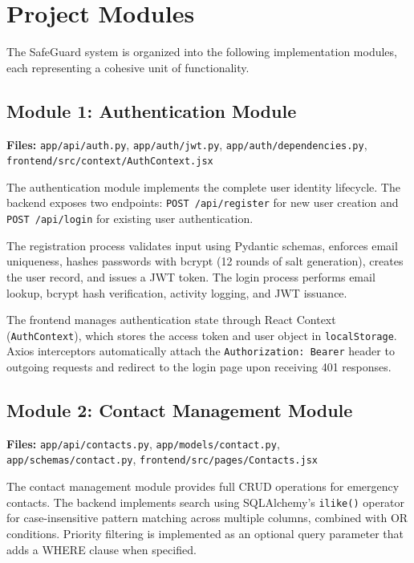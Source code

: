 \section{Project Modules}

The SafeGuard system is organized into the following implementation modules, each representing a cohesive unit of functionality.

\subsection{Module 1: Authentication Module}

\textbf{Files:} \texttt{app/api/auth.py}, \texttt{app/auth/jwt.py}, \texttt{app/auth/dependencies.py}, \texttt{frontend/src/context/AuthContext.jsx}

The authentication module implements the complete user identity lifecycle. The backend exposes two endpoints: \texttt{POST /api/register} for new user creation and \texttt{POST /api/login} for existing user authentication.

The registration process validates input using Pydantic schemas, enforces email uniqueness, hashes passwords with bcrypt (12 rounds of salt generation), creates the user record, and issues a JWT token. The login process performs email lookup, bcrypt hash verification, activity logging, and JWT issuance.

The frontend manages authentication state through React Context (\texttt{AuthContext}), which stores the access token and user object in \texttt{localStorage}. Axios interceptors automatically attach the \texttt{Authorization: Bearer} header to outgoing requests and redirect to the login page upon receiving 401 responses.

\subsection{Module 2: Contact Management Module}

\textbf{Files:} \texttt{app/api/contacts.py}, \texttt{app/models/contact.py}, \texttt{app/schemas/contact.py}, \texttt{frontend/src/pages/Contacts.jsx}

The contact management module provides full CRUD operations for emergency contacts. The backend implements search using SQLAlchemy's \texttt{ilike()} operator for case-insensitive pattern matching across multiple columns, combined with OR conditions. Priority filtering is implemented as an optional query parameter that adds a WHERE clause when specified.

